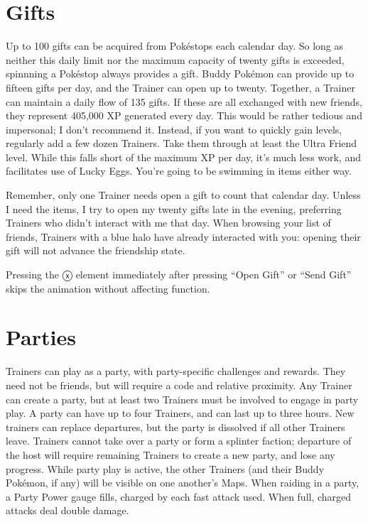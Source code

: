 \section{Gifts\label{sec:gifts}}
Up to 100 gifts can be acquired from Pokéstops each calendar day.
So long as neither this daily limit nor the maximum capacity of twenty gifts
 is exceeded, spinnning a Pokéstop always provides a gift.
Buddy Pokémon can provide up to fifteen gifts per day,
  and the Trainer can open up to twenty.
Together, a Trainer can maintain a daily flow of 135 gifts.
If these are all exchanged with new friends, they represent 405,000 XP generated every day.
This would be rather tedious and impersonal; I don't recommend it.
Instead, if you want to quickly gain levels, regularly add a few dozen Trainers.
Take them through at least the Ultra Friend level.
While this falls short of the maximum XP per day, it's much less work, and facilitates use of Lucky Eggs.
You're going to be swimming in items either way.

Remember, only one Trainer needs open a gift to count that calendar day.
Unless I need the items, I try to open my twenty gifts late in the evening,
  preferring Trainers who didn't interact with me that day.
When browsing your list of friends, Trainers with a blue halo have already interacted with you:
  opening their gift will not advance the friendship state.

\begin{tipbox}[title=A tip regarding gift UI]
Pressing the ⓧ  element immediately after pressing ``Open Gift'' or ``Send Gift''
 skips the animation without affecting function.
\end{tipbox}

\section{Parties\label{sec:parties}}
Trainers can play as a party, with party-specific challenges and rewards.
They need not be friends, but will require a code and relative proximity.
Any Trainer can create a party, but at least two Trainers must be involved to engage in party play.
A party can have up to four Trainers, and can last up to three hours.
New trainers can replace departures, but the party is dissolved if all other Trainers leave.
Trainers cannot take over a party or form a splinter faction; departure of the host will
  require remaining Trainers to create a new party, and lose any progress.
While party play is active, the other Trainers (and their Buddy Pokémon, if any)
  will be visible on one another's Maps.
When raiding in a party, a Party Power gauge fills, charged by each fast attack used.
When full, charged attacks deal double damage.

